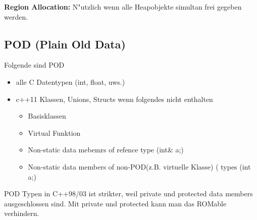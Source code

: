 

\textbf{Region Allocation:} N"utzlich wenn alle Heapobjekte simultan frei gegeben werden.
\subsection{POD (Plain Old Data)}
Folgende sind POD
\begin{itemize}
 \item alle C Datentypen (int, float, uws.)
 \item c++11 Klassen, Unions, Structs wenn folgendes nicht enthalten
 \begin{itemize}
     \item Basisklassen
     \item Virtual Funktion
     \item Non-static data mebemrs of refence type (int\& a;)
     \item Non-static data members of non-POD(z.B. virtuelle Klasse) ( types (int a;)
 \end{itemize}
\end{itemize}
POD Typen in C++98/03 ist strikter, weil private und protected data members ausgeschlossen sind. Mit private und protected kann man das ROMable verhindern.

